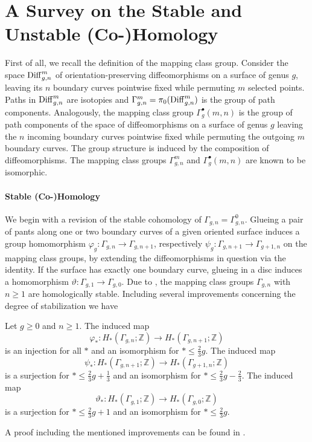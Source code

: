 \section{A Survey on the Stable and Unstable (Co-)Homology}
First of all, we recall the definition of the mapping class group.
Consider the space $\operatorname{Diff}_{g,n}^{m}$ of orientation-preserving diffeomorphisms on a surface of genus $g$, leaving its $n$ boundary curves pointwise fixed while permuting $m$ selected points.
Paths in $\operatorname{Diff}_{g,n}^{m}$ are isotopies and $\Gamma_{g,n}^m = \pi_0(\operatorname{Diff}_{g,n}^m)$ is the group of path components.
Analogously, the mapping class group $\Gamma_g^\bullet(m,n)$ is the group of path components of the space of diffeomorphisms on a surface of genus $g$ leaving the $n$ incoming boundary curves pointwise fixed while permuting the outgoing $m$ boundary curves.
The group structure is induced by the composition of diffeomorphisms.
The mapping class groups $\Gamma_{g,n}^m$ and $\Gamma_g^\bullet(m,n)$ are known to be isomorphic.

\paragraph{Stable (Co-)Homology}
We begin with a revision of the stable cohomology of $\Gamma_{g,n} = \Gamma_{g,n}^0$.
Glueing a pair of pants along one or two boundary curves of a given oriented surface induces a group homomorphism
$\varphi_g \colon \Gamma_{g,n} \to \Gamma_{g,n+1}$, respectively $\psi_g \colon \Gamma_{g, n+1} \to \Gamma_{g+1,n}$ on the mapping class groups,
by extending the diffeomorphisms in question via the identity.
If the surface has exactly one boundary curve, glueing in a disc induces a homomorphism $\vartheta \colon \Gamma_{g,1} \to \Gamma_{g,0}$.
Due to \cite{Harer1985}, the mapping class groups $\Gamma_{g,n}$ with $n \ge 1$ are homologically stable.
Including several improvements concerning the degree of stabilization we have
\begin{thm*}[Harer]
    Let $g \ge 0$ and $n \ge 1$.
    The induced map
    \[
        \varphi_\ast \colon H_\ast( \Gamma_{g,n}; \mathbb Z ) \to H_\ast( \Gamma_{g,n+1}; \mathbb Z)
    \]
    is an injection for all $\ast$ and an isomorphism for $\ast \le \frac{2}{3}g$.
    The induced map
    \[
        \psi_\ast \colon H_\ast( \Gamma_{g,n+1}; \mathbb Z ) \to H_\ast( \Gamma_{g+1,n}; \mathbb Z)
    \]
    is a surjection for $\ast \le \frac{2}{3}g + \frac{1}{3}$ and an isomorphism for $\ast \le \frac{2}{3}g - \frac{2}{3}$.
    The induced map
    \[
        \vartheta_\ast \colon H_\ast( \Gamma_{g,1}; \mathbb Z ) \to H_\ast( \Gamma_{g,0}; \mathbb Z)
    \]
    is a surjection for $\ast \le \frac{2}{3}g + 1$ and an isomorphism for $\ast \le \frac{2}{3}g$.
\end{thm*}
\label{page:stabilization_map}%
A proof including the mentioned improvements can be found in \cite{Wahl2012}.

